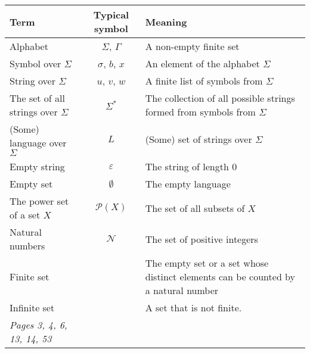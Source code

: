\documentclass[12pt, oneside]{article}
\begin{document}
\begin{center}
    \begin{tabular}{|p{2in}cp{4in}|}
    \hline 
    Term & Typical symbol & Meaning \\
    \hline\hline
    Alphabet & $\Sigma$, $\Gamma$ & A non-empty finite set	 \\ \hline
    Symbol over $\Sigma$  & $\sigma$, $b$, $x$ & An element of the alphabet $\Sigma$\\ \hline
    String over $\Sigma$  &	$u$, $v$, $w$ & A finite list of symbols from $\Sigma$\\ \hline
    The set of all strings over $\Sigma$ & $\Sigma^*$ & The collection of all possible strings formed from symbols from $\Sigma$ \\ \hline
    (Some) language over $\Sigma$& $L$ & (Some) set of strings over $\Sigma$ \\ \hline
    Empty string &$\varepsilon$ & The string of length $0$\\ \hline
    Empty set &$\emptyset$ & The empty language\\ \hline
    The power set of a set $X$ &$\mathcal{P}(X)$ & The set of all subsets of $X$ \\ \hline
    Natural numbers &$\mathcal{N}$ & The set of positive integers \\ \hline
    Finite set & & The empty set or a set whose distinct elements can be counted by a natural number\\ \hline
    Infinite set & & A set that is not finite.\\ 
    \hline\hline
    {\it Pages 3, 4, 6, 13, 14, 53}& & \\
    \hline
    \end{tabular}
\end{center}

\newpage
\end{document}

